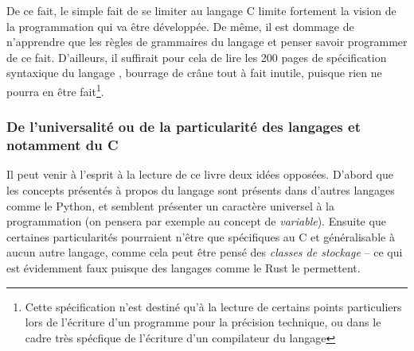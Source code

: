 \documentclass[../../main.tex]{subfiles}
\begin{document}
De ce fait, le simple fait de se limiter au langage C limite fortement la vision de la programmation qui va être développée. De même, il est dommage de n'apprendre que les règles de grammaires du langage et penser savoir programmer de ce fait. D'ailleurs, il suffirait pour cela de lire les 200 pages de spécification syntaxique du langage \cite{c11}, bourrage de crâne tout à fait inutile, puisque rien ne pourra en être fait\footnote{Cette spécification n'est destiné qu'à la lecture de certains points particuliers lors de l'écriture d'un programme pour la précision technique, ou dans le cadre très spécfique de l'écriture d'un compilateur du langage}.
\subsubsection{De l'universalité ou de la particularité des langages et notamment du C}
Il peut venir à l'esprit à la lecture de ce livre deux idées opposées. D'abord que les concepts présentés à propos du langage sont présents dans d'autres langages comme le Python, et semblent présenter un caractère universel à la programmation (on pensera par exemple au concept de \textit{variable}). Ensuite que certaines particularités pourraient n'être que spécifiques au C et généralisable à aucun autre langage, comme cela peut être pensé des \textit{classes de stockage} -- ce qui est évidemment faux puisque des langages comme le Rust le permettent.
 
\end{document}
